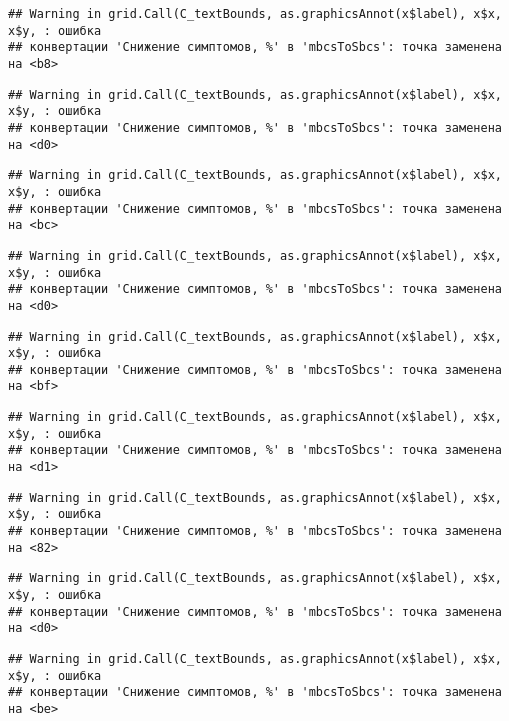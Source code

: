 \documentclass[
]{article}
\begin{document}
\begin{verbatim}
## Warning in grid.Call(C_textBounds, as.graphicsAnnot(x$label), x$x, x$y, : ошибка
## конвертации 'Снижение симптомов, %' в 'mbcsToSbcs': точка заменена на <b8>
\end{verbatim}

\begin{verbatim}
## Warning in grid.Call(C_textBounds, as.graphicsAnnot(x$label), x$x, x$y, : ошибка
## конвертации 'Снижение симптомов, %' в 'mbcsToSbcs': точка заменена на <d0>
\end{verbatim}

\begin{verbatim}
## Warning in grid.Call(C_textBounds, as.graphicsAnnot(x$label), x$x, x$y, : ошибка
## конвертации 'Снижение симптомов, %' в 'mbcsToSbcs': точка заменена на <bc>
\end{verbatim}

\begin{verbatim}
## Warning in grid.Call(C_textBounds, as.graphicsAnnot(x$label), x$x, x$y, : ошибка
## конвертации 'Снижение симптомов, %' в 'mbcsToSbcs': точка заменена на <d0>
\end{verbatim}

\begin{verbatim}
## Warning in grid.Call(C_textBounds, as.graphicsAnnot(x$label), x$x, x$y, : ошибка
## конвертации 'Снижение симптомов, %' в 'mbcsToSbcs': точка заменена на <bf>
\end{verbatim}

\begin{verbatim}
## Warning in grid.Call(C_textBounds, as.graphicsAnnot(x$label), x$x, x$y, : ошибка
## конвертации 'Снижение симптомов, %' в 'mbcsToSbcs': точка заменена на <d1>
\end{verbatim}

\begin{verbatim}
## Warning in grid.Call(C_textBounds, as.graphicsAnnot(x$label), x$x, x$y, : ошибка
## конвертации 'Снижение симптомов, %' в 'mbcsToSbcs': точка заменена на <82>
\end{verbatim}

\begin{verbatim}
## Warning in grid.Call(C_textBounds, as.graphicsAnnot(x$label), x$x, x$y, : ошибка
## конвертации 'Снижение симптомов, %' в 'mbcsToSbcs': точка заменена на <d0>
\end{verbatim}

\begin{verbatim}
## Warning in grid.Call(C_textBounds, as.graphicsAnnot(x$label), x$x, x$y, : ошибка
## конвертации 'Снижение симптомов, %' в 'mbcsToSbcs': точка заменена на <be>
\end{verbatim}
\end{document}
